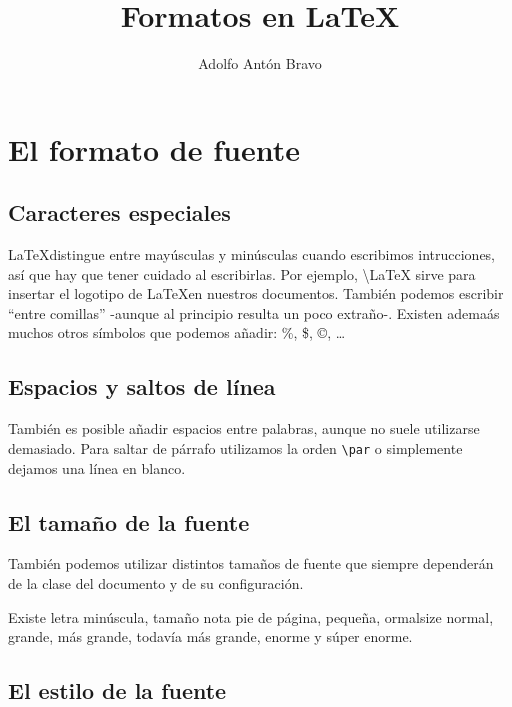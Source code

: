 \documentclass[11pt,twoside,a4paper]{article}
\begin{document}
\title{Formatos en \LaTeX}
\author{Adolfo Antón Bravo}
\maketitle{}
\section{El formato de fuente}
\label{sec:formato}

\subsection{Caracteres especiales}
\label{sec:caracteres}
\LaTeX distingue entre mayúsculas y minúsculas cuando escribimos intrucciones, así que hay que tener cuidado al escribirlas. Por ejemplo, \textbackslash LaTeX sirve para insertar el logotipo de \LaTeX en nuestros documentos.
También podemos escribir ``entre comillas'' -aunque al principio resulta un poco extraño-. Existen ademaás muchos otros símbolos que podemos añadir: \%, \$, \copyright, \ldots

\subsection{Espacios y saltos de línea}
\label{sec:espacioslinea}

También es posible añadir espacios \hspace{2cm} entre palabras, aunque no suele utilizarse demasiado.
Para saltar de párrafo utilizamos la orden \texttt{\textbackslash par} o simplemente dejamos una línea en blanco.

\subsection{El tamaño de la fuente}
\label{sec:fuente}

También podemos utilizar distintos tamaños de fuente que siempre dependerán de la clase del documento y de su configuración.

Existe letra \tiny minúscula, \scriptsize tamaño nota \footnotesize pie de página, \small pequeña, 
ormalsize normal, \large grande, \Large más grande, \LARGE todavía más grande, \huge enorme y \Huge súper enorme. 

\subsection{El estilo de la fuente}
\label{sec:estilo}
\end{document}
